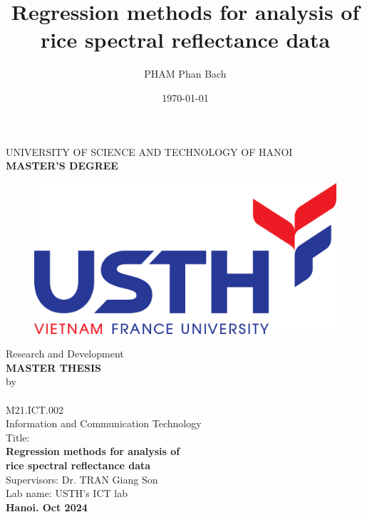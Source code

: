 \documentclass[12pt]{report}
\title{Regression methods for analysis of rice spectral reflectance data }
\author{PHAM Phan Bach}
\date{\today}
\begin{document}
\begin{titlepage}
    \begin{center}
    \MakeUppercase{\Large{{University of Science and Technology of Hanoi}}} \\ 
    \MakeUppercase{\Large{\textbf{Master's degree}}} \\ [1cm]
    
    \begin{figure}[ht!]
        \centering
        \includegraphics[width=.5\textwidth, height=\textheight, keepaspectratio]{logos/usth-logo.png}
    \end{figure}
            
    \vspace {0.5cm}
    \Large{Research and Development} \\
    \MakeUppercase{\Huge{\textbf{Master thesis}}} \\ [1cm]
    \Large{by} \\
    \Large{\theauthor} \\
    \Large{M21.ICT.002} \\
    \Large{Information and Communication Technology} \\ [0.75cm]
    \Large{Title:} \\
    \huge{\textbf{Regression methods for analysis of \\ rice spectral reflectance data}} \\[0.75cm]
    \Large{Supervisors: Dr. TRAN Giang Son \\Lab name: USTH's ICT lab} \\ [1.5cm]
    
    \Large{\textbf{Hanoi. Oct 2024}}
    \end{center}
\end{titlepage}
\end{document}
